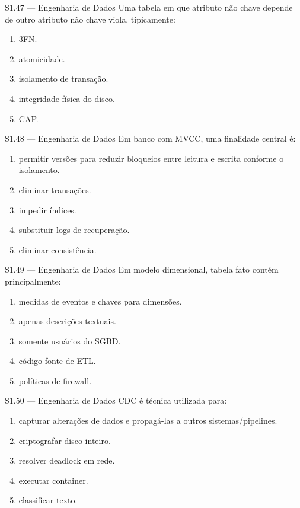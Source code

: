 \begin{questao}{S1.47 — Engenharia de Dados}
Uma tabela em que atributo não chave depende de outro atributo não chave viola, tipicamente:
\begin{enumerate}[label=\Alph*)]\item 3FN.\item atomicidade.\item isolamento de transação.\item integridade física do disco.\item CAP.\end{enumerate}
\end{questao}

\begin{questao}{S1.48 — Engenharia de Dados}
Em banco com MVCC, uma finalidade central é:
\begin{enumerate}[label=\Alph*)]\item permitir versões para reduzir bloqueios entre leitura e escrita conforme o isolamento.\item eliminar transações.\item impedir índices.\item substituir logs de recuperação.\item eliminar consistência.\end{enumerate}
\end{questao}

\begin{questao}{S1.49 — Engenharia de Dados}
Em modelo dimensional, tabela fato contém principalmente:
\begin{enumerate}[label=\Alph*)]\item medidas de eventos e chaves para dimensões.\item apenas descrições textuais.\item somente usuários do SGBD.\item código-fonte de ETL.\item políticas de firewall.\end{enumerate}
\end{questao}

\begin{questao}{S1.50 — Engenharia de Dados}
CDC é técnica utilizada para:
\begin{enumerate}[label=\Alph*)]\item capturar alterações de dados e propagá-las a outros sistemas/pipelines.\item criptografar disco inteiro.\item resolver deadlock em rede.\item executar container.\item classificar texto.\end{enumerate}
\end{questao}

